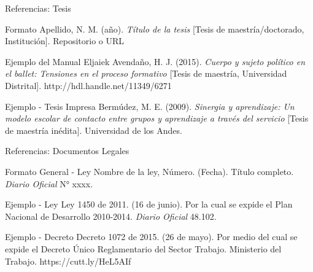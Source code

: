 \documentclass[spanish,aspectratio=169]{beamer}
\begin{document}
\begin{frame}{Referencias: Tesis}
	\begin{block}{Formato}
		\small
		Apellido, N. M. (año). \textit{Título de la tesis} [Tesis de maestría/doctorado, Institución]. Repositorio o URL
	\end{block}
	
	\begin{exampleblock}{Ejemplo del Manual}
		\footnotesize
		Eljaiek Avendaño, H. J. (2015). \textit{Cuerpo y sujeto político en el ballet: Tensiones en el proceso formativo} [Tesis de maestría, Universidad Distrital]. http://hdl.handle.net/11349/6271
	\end{exampleblock}
	
	\begin{exampleblock}{Ejemplo - Tesis Impresa}
		\footnotesize
		Bermúdez, M. E. (2009). \textit{Sinergia y aprendizaje: Un modelo escolar de contacto entre grupos y aprendizaje a través del servicio} [Tesis de maestría inédita]. Universidad de los Andes.
	\end{exampleblock}
\end{frame}

\begin{frame}{Referencias: Documentos Legales}
	\begin{block}{Formato General - Ley}
		\small
		Nombre de la ley, Número. (Fecha). Título completo. \textit{Diario Oficial} N° xxxx.
	\end{block}
	
	\begin{exampleblock}{Ejemplo - Ley}
		\footnotesize
		Ley 1450 de 2011. (16 de junio). Por la cual se expide el Plan Nacional de Desarrollo 2010-2014. \textit{Diario Oficial} 48.102.
	\end{exampleblock}
	
	\begin{exampleblock}{Ejemplo - Decreto}
		\footnotesize
		Decreto 1072 de 2015. (26 de mayo). Por medio del cual se expide el Decreto Único Reglamentario del Sector Trabajo. Ministerio del Trabajo. https://cutt.ly/HeL5AIf
	\end{exampleblock}
\end{frame}
\end{document}
